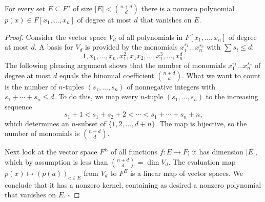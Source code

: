 \begin{lemma}
  \label{ch35lemma2}
For every set $E \subseteq F^n$ of size $|E| < \binom{n+d}{d}$ there is a nonzero
polynomial $p(x) \in F[x_1, \dots, x_n]$ of degree at most $d$ that vanishes on $E$.
\end{lemma}
\begin{proof}
Consider the vector space $V_d$ of all polynomials in $F[x_1, \dots, x_n]$ of degree at most $d$.
A basis for $V_d$ is provided by the monomials $x_1^{s_1} \dots x_n^{s_n}$ with $\sum s_i \leq d$:
\[
1, x_1, \dots, x_n, x_1^2, x_1 x_2, \dots, x_1^3, \dots, x_n^d.
\]
The following pleasing argument shows that the number of monomials $x_1^{s_1} \dots x_n^{s_n}$ of
degree at most $d$ equals the binomial coefficient $\binom{n+d}{d}$. What we want to count is
the number of $n$-tuples $(s_1, \dots, s_n)$ of nonnegative integers with
$s_1 + \cdots + s_n \leq d$. To do this, we map every $n$-tuple $(s_1, \dots, s_n)$ to the
increasing sequence
\[
s_1 + 1 < s_1 + s_2 + 2 < \cdots < s_1 + \cdots + s_n + n,
\]
which determines an $n$-subset of $\{1, 2, \dots, d + n\}$. The map is bijective, so the number of
 monomials is $\binom{n+d}{d}$.

Next look at the vector space $F^E$ of all functions $f : E \to F$; it has dimension $|E|$,
which by assumption is less than $\binom{n+d}{d} = \dim V_d$. The evaluation
map $p(x) \mapsto (p(a))_{a \in E}$ from $V_d$ to $F^E$ is a linear map of vector spaces.
We conclude that it has a nonzero kernel,
containing as desired a nonzero polynomial that vanishes on $E$. \(\square\)
\end{proof}

